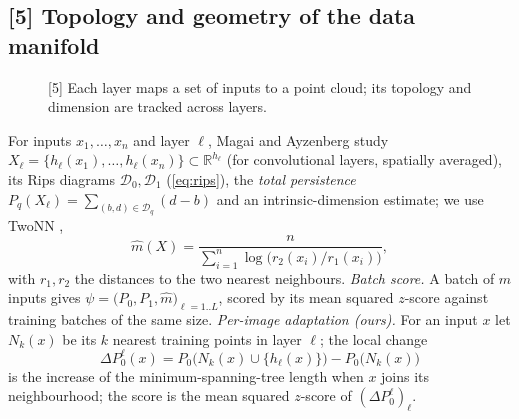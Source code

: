 \documentclass[11pt]{article}
\newcommand{\R}{\mathbb{R}}
\newcommand{\PD}{\mathcal{D}}
\begin{document}
\subsection{[5] Topology and geometry of the data manifold}
\begin{figure}[h]
\centering
{}
\caption{[5] Each layer maps a set of inputs to a point cloud; its topology and dimension are
tracked across layers.}
\label{fig:manifold}
\end{figure}
For inputs $x_1,\dots,x_n$ and layer $\ell$, Magai and Ayzenberg \citep{magai2022topology} study
$X_\ell=\{h_\ell(x_1),\dots,h_\ell(x_n)\}\subset\R^{h_\ell}$ (for convolutional layers, spatially
averaged), its Rips diagrams $\PD_0,\PD_1$ (\cref{eq:rips}), the \emph{total persistence}
$P_q(X_\ell)=\sum_{(b,d)\in\PD_q}(d-b)$ and an intrinsic-dimension estimate; we use TwoNN
\citep{facco2017twonn},
\begin{equation}
  \hat m(X) = \frac{n}{\sum_{i=1}^{n}\log\bigl(r_2(x_i)/r_1(x_i)\bigr)},
  \label{eq:twonn}
\end{equation}
with $r_1,r_2$ the distances to the two nearest neighbours. \emph{Batch score.} A batch of $m$
inputs gives $\psi=\bigl(P_0,P_1,\hat m\bigr)_{\ell=1..L}$, scored by its mean squared $z$-score
against training batches of the same size. \emph{Per-image adaptation (ours).} For an input $x$
let $N_k(x)$ be its $k$ nearest training points in layer $\ell$; the local change
\begin{equation}
  \Delta P_0^{\ell}(x) = P_0\bigl(N_k(x)\cup\{h_\ell(x)\}\bigr) - P_0\bigl(N_k(x)\bigr)
  \label{eq:local}
\end{equation}
is the increase of the minimum-spanning-tree length when $x$ joins its neighbourhood; the score
is the mean squared $z$-score of $(\Delta P_0^{\ell})_\ell$.
\end{document}
